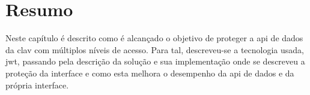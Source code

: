 \section{Resumo}

Neste capítulo é descrito como é alcançado o objetivo de proteger a \acrshort{api} de dados da \acrshort{clav} com múltiplos níveis de acesso.
Para tal, descreveu-se a tecnologia usada, \acrshort{jwt}, passando pela descrição da solução e sua implementação onde se descreveu a proteção da interface e como esta melhora o desempenho da \acrshort{api} de dados e da própria interface.
